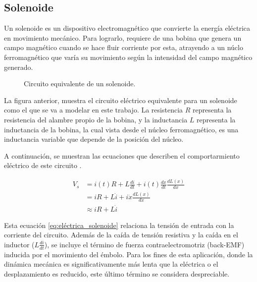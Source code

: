 \documentclass[journal]{IEEEtran}
\begin{document}
\subsection{Solenoide}
Un solenoide es un dispositivo electromagnético que convierte la energía eléctrica en movimiento mecánico. Para lograrlo, 
requiere de una bobina que genera un campo magnético cuando se hace fluir corriente por esta, atrayendo a un núclo ferromagnético
que varía su movimiento según la intensidad del campo magnético generado. 


\begin{figure}[H]
  \centering
   
  \caption{Circuito equivalente de un solenoide.}
  \label{fig:circuito_solenoide}
\end{figure}

La figura anterior, muestra el circuito eléctrico equivalente para un solenoide como el que se va a modelar
en este trabajo. La resistencia $R$ representa la resistencia del alambre propio de la bobina, y la inductancia $L$
representa la inductancia de la bobina, la cual vista desde el núcleo ferromagnético, 
es una inductancia variable que depende de la posición del núcleo.

\setlength{\parskip}{1em}

A continuación, se muestran las ecuaciones que describen el comportarmiento 
eléctrico de este circuito \cite{Alexander2018}.

\begin{equation}
\begin{aligned}
    V_s &= i(t)R + L \frac{di}{dt} + i(t) \frac{dx}{dt} \frac{dL(x)}{dx} \\
        &= iR + L \dot{i} + i \dot{x} \frac{dL(x)}{dx} \\
        &\approx iR + L \dot{i}
\end{aligned}
\label{eq:eléctrica_solenoide}
\end{equation}

Esta ecuación \ref{eq:eléctrica_solenoide} relaciona la tensión de entrada con la corriente del circuito. Además de la caída de tensión resistiva 
y la caída en el inductor ($L\frac{di}{dt}$), se incluye el término de fuerza contraelectromotriz (back-EMF) inducida 
por el movimiento del émbolo. Para los fines de esta aplicación, donde la dinámica mecánica es significativamente más 
lenta que la eléctrica o el desplazamiento es reducido, este último término se considera despreciable.

\setlength{\parskip}{1em}
\end{document}
